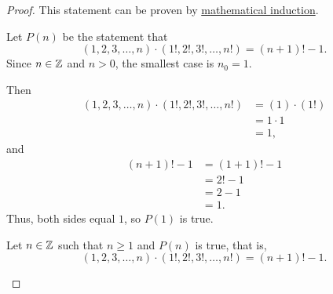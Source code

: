 \begin{proof}{
    This statement can be proven by %
    \hyperref[subsections:techniques:universal:induction]
        {mathematical induction}.

    \begin{panel}[Setup.]{
        Let $P(n)$ be the statement that %
        \[
            (1, 2, 3, \dotsc, n) \cdot (1!, 2!, 3!, \dotsc, n!) = (n + 1)! - 1.
        \]
        Since $n \in \mathbb{Z}$ and $n > 0$, the smallest case is $n_0 = 1$.
    }
    \end{panel}

    \begin{panel}[Base Case: Let $n = 1$.]{
        Then %
        \begin{align*}
            (1, 2, 3, \dotsc, n) \cdot (1!, 2!, 3!, \dotsc, n!)
                &= (1) \cdot (1!)\\
                &= 1 \cdot 1\\
                &= 1,
        \end{align*}
        and %
        \begin{align*}
            (n + 1)! - 1
                &= (1 + 1)! - 1\\
                &= 2! - 1\\
                &= 2 - 1\\
                &= 1.
        \end{align*}
        Thus, both sides equal $1$, so $P(1)$ is true.
    }
    \end{panel}

    \begin{panel}{
        Let $n \in \mathbb{Z}$ such that $n \ge 1$ and $P(n)$ is true, that is, %
        \[
            (1, 2, 3, \dotsc, n) \cdot (1!, 2!, 3!, \dotsc, n!) = (n + 1)! - 1.
        \]
    }
    \end{panel}

}
\end{proof}
